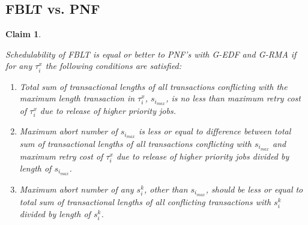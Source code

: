 \documentclass[12pt,english]{report}
\newtheorem{clm}{Claim}
\begin{document}
\subsection{FBLT vs. PNF}

\begin{clm}\label{clm:fblt_pnf_edf}

Schedulability of FBLT is equal or better to PNF's with G-EDF and
G-RMA if for any $\tau_{i}^{x}$ the following conditions are satisfied:
\begin{enumerate}
\item Total sum of transactional lengths of all transactions conflicting
with the maximum length transaction in $\tau_{i}^{x}$, $s_{i_{max}}$,
is no less than maximum retry cost of $\tau_{i}^{x}$ due to release
of higher priority jobs.
\item Maximum abort number of $s_{i_{max}}$ is less or equal to difference
between total sum of transactional lengths of all transactions conflicting
with $s_{i_{max}}$ and maximum retry cost of $\tau_{i}^{x}$ due
to release of higher priority jobs divided by length of $s_{i_{max}}$.
\item Maximum abort number of any $s_{i}^{k}$, other than $s_{i_{max}}$,
should be less or equal to total sum of transactional lengths of all
conflicting transactions with $s_{i}^{k}$ divided by length of $s_{i}^{k}$.
\end{enumerate}
\end{clm}
\end{document}

